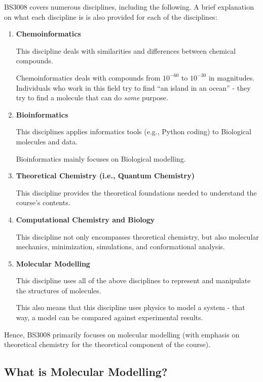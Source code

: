\documentclass[
  letterpaper,
  DIV=11,
  numbers=noendperiod]{scrreprt}
\begin{document}
BS3008 covers numerous disciplines, including the following. A brief
explanation on what each discipline is is also provided for each of the
disciplines:

\begin{enumerate}
\def\labelenumi{\arabic{enumi}.}
\item
  \textbf{Chemoinformatics}

  This discipline deals with similarities and differences between
  chemical compounds.

  Chemoinformatics deals with compounds from \(10^{-60}\) to
  \(10^{-30}\) in magnitudes. Individuals who work in this field try to
  find ``an island in an ocean'' - they try to find a molecule that can
  do \emph{some} purpose.
\item
  \textbf{Bioinformatics}

  This disciplines applies informatics tools (e.g., Python coding) to
  Biological molecules and data.

  Bioinformatics mainly focuses on Biological modelling.
\item
  \textbf{Theoretical Chemistry (i.e., Quantum Chemistry)}

  This discipline provides the theoretical foundations needed to
  understand the course's contents.
\item
  \textbf{Computational Chemistry and Biology}

  This discipline not only encompasses theoretical chemistry, but also
  molecular mechanics, minimization, simulations, and conformational
  analysis.
\item
  \textbf{Molecular Modelling}

  This discipline uses all of the above disciplines to represent and
  manipulate the structures of molecules.

  This also means that this discipline uses physics to model a system -
  that way, a model can be compared against experimental results.
\end{enumerate}

Hence, BS3008 primarily focuses on molecular modelling (with emphasis on
theoretical chemistry for the theoretical component of the course).

\hypertarget{what-is-molecular-modelling}{%
\subsection{What is Molecular
Modelling?}\label{what-is-molecular-modelling}}
\end{document}
